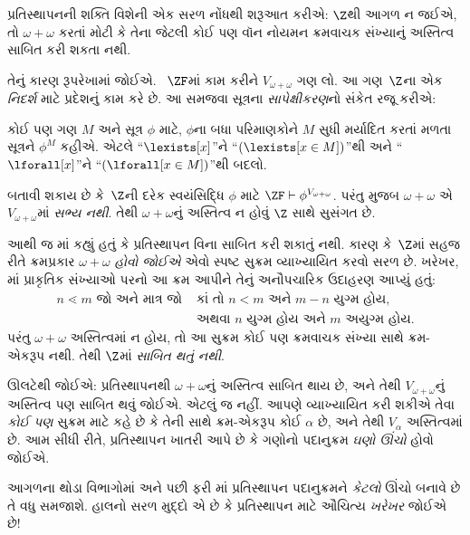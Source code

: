 \documentclass[../../../include/open-logic-section]{subfiles}
\begin{document}

પ્રતિસ્થાપનની શક્તિ વિશેની એક સરળ નોંધથી શરૂઆત કરીએ:
$\Z$થી આગળ ન જઈએ, તો $\omega + \omega$ કરતાં મોટી કે
તેના જેટલી કોઈ પણ વૉન નોયમન ક્રમવાચક સંખ્યાનું અસ્તિત્વ
સાબિત કરી શકતા નથી.

તેનું કારણ રૂપરેખામાં જોઈએ. ~$\ZF$માં કામ કરીને
$V_{\omega+\omega}$ ગણ લો. આ ગણ~$\Z$ના એક \emph{નિદર્શ}
માટે પ્રદેશનું કામ કરે છે. આ સમજવા સૂત્રના
\emph{સાપેક્ષીકરણ}નો સંકેત રજૂ કરીએ:
\begin{defn}
	કોઈ પણ ગણ $M$ અને સૂત્ર $\phi$ માટે, $\phi$ના બધા
	પરિમાણકોને $M$ સુધી મર્યાદિત કરતાં મળતા સૂત્રને $\phi^M$
	કહીએ. એટલે ``$\lexists[x]$''ને ``$(\lexists[x \in M])$''થી
	અને ``$\lforall[x]$''ને ``$(\lforall[x \in M])$''થી બદલો.
\end{defn}\noindent
બતાવી શકાય છે કે~$\Z$ની દરેક સ્વયંસિદ્ધિ $\phi$ માટે
$\ZF \vdash
\phi^{V_{\omega+\omega}}$. પરંતુ
 મુજબ $\omega+\omega$
એ $V_{\omega+\omega}$માં \emph{સભ્ય નથી}. તેથી
$\omega+\omega$નું અસ્તિત્વ ન હોવું $\Z$ સાથે સુસંગત છે.

આથી જ માં કહ્યું હતું કે
પ્રતિસ્થાપન વિના સાબિત કરી શકાતું નથી. કારણ કે~$\Z$માં
સહજ રીતે ક્રમપ્રકાર $\omega+\omega$ \emph{હોવો જોઈએ} એવો
સ્પષ્ટ સુક્રમ વ્યાખ્યાયિત કરવો સરળ છે. ખરેખર,
માં પ્રાકૃતિક સંખ્યાઓ પરનો આ
ક્રમ આપીને તેનું અનૌપચારિક ઉદાહરણ આપ્યું હતું:
\begin{align*}
	n \lessdot m \text{ જો અને માત્ર જો }&\text{કાં તો }n < m\text{ અને }m-n\text{ યુગ્મ હોય,}\\
	& \text{અથવા $n$ યુગ્મ હોય અને $m$ અયુગ્મ હોય.}
\end{align*}
પરંતુ $\omega+\omega$ અસ્તિત્વમાં ન હોય, તો આ સુક્રમ કોઈ
પણ ક્રમવાચક સંખ્યા સાથે ક્રમ-એકરૂપ નથી. તેથી $\Z$માં
\emph{સાબિત થતું નથી}.

ઊલટેથી જોઈએ: પ્રતિસ્થાપનથી $\omega+\omega$નું અસ્તિત્વ
સાબિત થાય છે, અને તેથી $V_{\omega+\omega}$નું અસ્તિત્વ પણ
સાબિત થવું જોઈએ. એટલું જ નહીં. આપણે વ્યાખ્યાયિત કરી શકીએ
તેવા \emph{કોઈ પણ} સુક્રમ માટે
 કહે છે કે
તેની સાથે ક્રમ-એકરૂપ કોઈ $\alpha$ છે, અને તેથી $V_\alpha$
અસ્તિત્વમાં છે. આમ સીધી રીતે, પ્રતિસ્થાપન ખાતરી આપે છે કે
ગણોનો પદાનુક્રમ \emph{ઘણો ઊંચો} હોવો જોઈએ.

આગળના થોડા વિભાગોમાં અને પછી ફરી
માં પ્રતિસ્થાપન પદાનુક્રમને
\emph{કેટલો} ઊંચો બનાવે છે તે વધુ સમજાશે. હાલનો સરળ મુદ્દો
એ છે કે પ્રતિસ્થાપન માટે ઔચિત્ય \emph{ખરેખર} જોઈએ છે!
\end{document}
